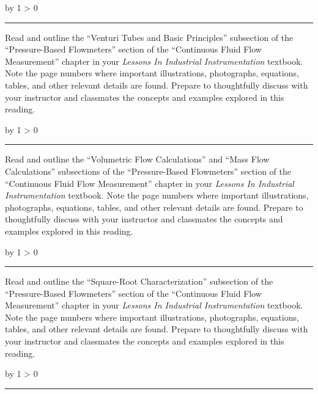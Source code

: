 \documentclass[12pt,a4paper]{article}
\def\oppgave{
            \advance\questnum by 1
            \ifnum \questnum > 0
                 \hrule
                 \vskip 3pt
                 \leftline{Oppgave \the\questnum}
                 \vskip 3pt \fi}
\begin{document}
\vskip 10pt \filbreak 
\oppgave{} 

Read and outline the ``Venturi Tubes and Basic Principles'' subsection of the ``Pressure-Based Flowmeters'' section of the ``Continuous Fluid Flow Measurement'' chapter in your {\it Lessons In Industrial Instrumentation} textbook.  Note the page numbers where important illustrations, photographs, equations, tables, and other relevant details are found.  Prepare to thoughtfully discuss with your instructor and classmates the concepts and examples explored in this reading.

\vskip 10pt \filbreak 
\oppgave{} 

Read and outline the ``Volumetric Flow Calculations'' and ``Mass Flow Calculations'' subsections of the ``Pressure-Based Flowmeters'' section of the ``Continuous Fluid Flow Measurement'' chapter in your {\it Lessons In Industrial Instrumentation} textbook.  Note the page numbers where important illustrations, photographs, equations, tables, and other relevant details are found.  Prepare to thoughtfully discuss with your instructor and classmates the concepts and examples explored in this reading.


\vskip 10pt \filbreak 
\oppgave{} 

Read and outline the ``Square-Root Characterization'' subsection of the ``Pressure-Based Flowmeters'' section of the ``Continuous Fluid Flow Measurement'' chapter in your {\it Lessons In Industrial Instrumentation} textbook.  Note the page numbers where important illustrations, photographs, equations, tables, and other relevant details are found.  Prepare to thoughtfully discuss with your instructor and classmates the concepts and examples explored in this reading.

\vskip 10pt \filbreak 
\oppgave{} 
\end{document}
